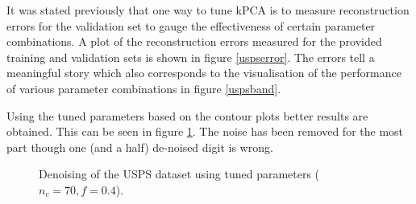 \par It was stated previously that one way to tune kPCA is to measure reconstruction errors for the validation set to gauge the effectiveness of certain parameter combinations. A plot of the reconstruction errors measured for the provided training and validation sets is shown in figure \ref{uspserror}. The errors tell a meaningful story which also corresponds to the visualisation of the performance of various parameter combinations in figure \ref{uspsband}.

\par Using the tuned parameters based on the contour plots better results are obtained. This can be seen in figure \ref{uspsresult}. The noise has been removed for the most part though one (and a half) de-noised digit is wrong.

\begin{figure}[h]
\centering
{}\hfil
{}\hfil
{}\hfil
\caption{Denoising of the USPS dataset using tuned parameters ($n_c=70,f=0.4$).}
\label{uspsresult}
\end{figure}

